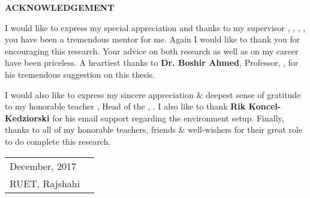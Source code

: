 \documentclass[document.tex]{subfiles}
\begin{document}

\begin{center}
\textbf{{\fontsize{16pt}{0.5cm}\selectfont ACKNOWLEDGEMENT}}
\vspace{1cm}
\end{center}

\noindent I would like to express my special appreciation and thanks to my supervisor \textbf{\thesissupervisor}, \thesissupervisordesignation, \deptT, \ruet, you have been a tremendous mentor for me. Again I would like to thank you for encouraging this research. Your advice on both research as well as on my career have been priceless. A heartiest thanks to \textbf{Dr. Boshir Ahmed}, Professor, \deptT, \ruet for his tremendous suggestion on this thesis.

\noindent I would also like to express my sincere appreciation \& deepest sense of gratitude to my honorable teacher \textbf{\depthead}, Head of the \deptT, \ruet.
\noindent I also like to thank \textbf{Rik Koncel-Kedziorski} for his email support regarding the environment setup.
\noindent Finally, thanks to all of my honorable teachers, friends \& well-wishers for their great role to do complete this research.

\vfill
\noindent 
\begin{tabularx}{\textwidth}{X X}
  {\fontsize{14pt}{0.5cm}\selectfont December, 2017} & \raggedleft { \fontsize{14pt}{0.5cm}\selectfont \authorname }\tabularnewline
{\fontsize{14pt}{0.5cm}\selectfont RUET, Rajshahi} & \tabularnewline
\end{tabularx}



\clearpage
\end{document}
